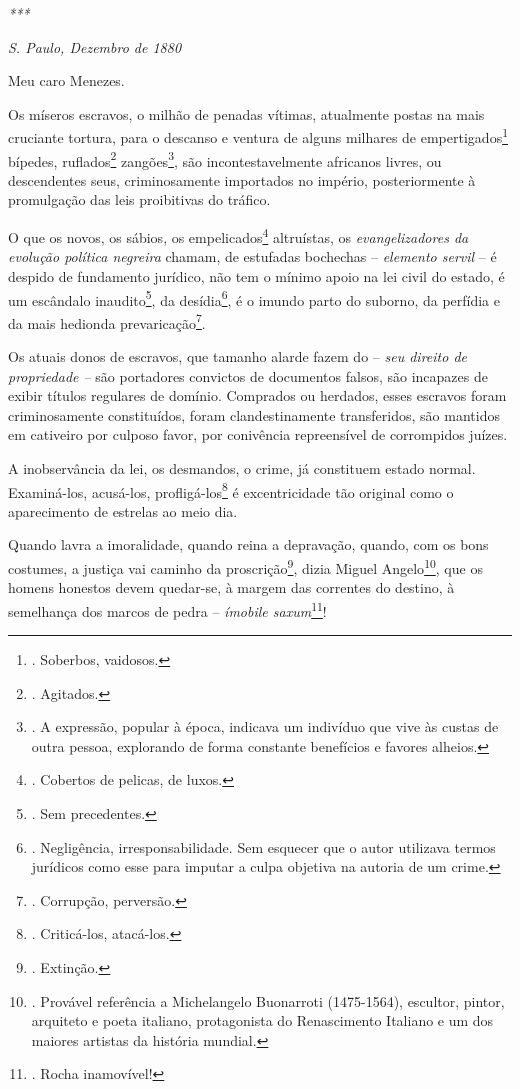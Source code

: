 \emph{***}

\emph{S. Paulo, Dezembro de 1880}

Meu caro Menezes.

Os míseros escravos, o milhão de penadas vítimas, atualmente postas na
mais cruciante tortura, para o descanso e ventura de alguns milhares de
empertigados\footnote{. Soberbos, vaidosos.} bípedes, ruflados\footnote{.
  Agitados.} zangões\footnote{. A expressão, popular à época, indicava
  um indivíduo que vive às custas de outra pessoa, explorando de forma
  constante benefícios e favores alheios.}, são incontestavelmente
africanos livres, ou descendentes seus, criminosamente importados no
império, posteriormente à promulgação das leis proibitivas do tráfico.

O que os novos, os sábios, os empelicados\footnote{. Cobertos de
  pelicas, de luxos.} altruístas, os \emph{evangelizadores da evolução
política negreira} chamam, de estufadas bochechas -- \emph{elemento
servil} -- é despido de fundamento jurídico, não tem o mínimo apoio na
lei civil do estado, é um escândalo inaudito\footnote{. Sem precedentes.},
da desídia\footnote{. Negligência, irresponsabilidade. Sem esquecer que
  o autor utilizava termos jurídicos como esse para imputar a culpa
  objetiva na autoria de um crime.}, é o imundo parto do suborno, da
perfídia e da mais hedionda prevaricação\footnote{. Corrupção,
  perversão.}.

Os atuais donos de escravos, que tamanho alarde fazem do -- \emph{seu
direito de propriedade --} são portadores convictos de documentos
falsos, são incapazes de exibir títulos regulares de domínio. Comprados
ou herdados, esses escravos foram criminosamente constituídos, foram
clandestinamente transferidos, são mantidos em cativeiro por culposo
favor, por conivência repreensível de corrompidos juízes.

A inobservância da lei, os desmandos, o crime, já constituem estado
normal. Examiná-los, acusá-los, profligá-los\footnote{. Criticá-los,
  atacá-los.} é excentricidade tão original como o aparecimento de
estrelas ao meio dia.

Quando lavra a imoralidade, quando reina a depravação, quando, com os
bons costumes, a justiça vai caminho da proscrição\footnote{. Extinção.},
dizia Miguel Angelo\footnote{. Provável referência a Michelangelo
  Buonarroti (1475-1564), escultor, pintor, arquiteto e poeta italiano,
  protagonista do Renascimento Italiano e um dos maiores artistas da
  história mundial.}, que os homens honestos devem quedar-se, à margem
das correntes do destino, à semelhança dos marcos de pedra --
\emph{ímobile saxum}\footnote{. Rocha inamovível!}!

